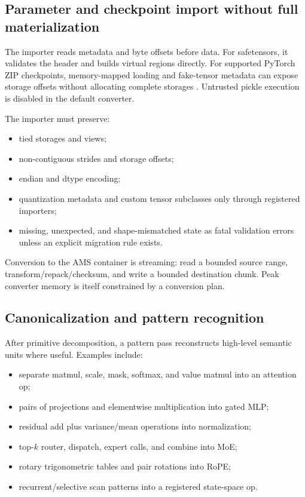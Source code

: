 \subsection{Parameter and checkpoint import without full materialization}

The importer reads metadata and byte offsets before data. For safetensors, it validates the header and builds virtual regions directly. For supported PyTorch ZIP checkpoints, memory-mapped loading and fake-tensor metadata can expose storage offsets without allocating complete storages \cite{pytorch_serialization}. Untrusted pickle execution is disabled in the default converter.

The importer must preserve:

\begin{itemize}
  \item tied storages and views;
  \item non-contiguous strides and storage offsets;
  \item endian and dtype encoding;
  \item quantization metadata and custom tensor subclasses only through registered importers;
  \item missing, unexpected, and shape-mismatched state as fatal validation errors unless an explicit migration rule exists.
\end{itemize}

Conversion to the AMS container is streaming: read a bounded source range, transform/repack/checksum, and write a bounded destination chunk. Peak converter memory is itself constrained by a conversion plan.

\subsection{Canonicalization and pattern recognition}

After primitive decomposition, a pattern pass reconstructs high-level semantic units where useful. Examples include:

\begin{itemize}
  \item separate matmul, scale, mask, softmax, and value matmul into an attention op;
  \item pairs of projections and elementwise multiplication into gated MLP;
  \item residual add plus variance/mean operations into normalization;
  \item top-$k$ router, dispatch, expert calls, and combine into MoE;
  \item rotary trigonometric tables and pair rotations into RoPE;
  \item recurrent/selective scan patterns into a registered state-space op.
\end{itemize}


